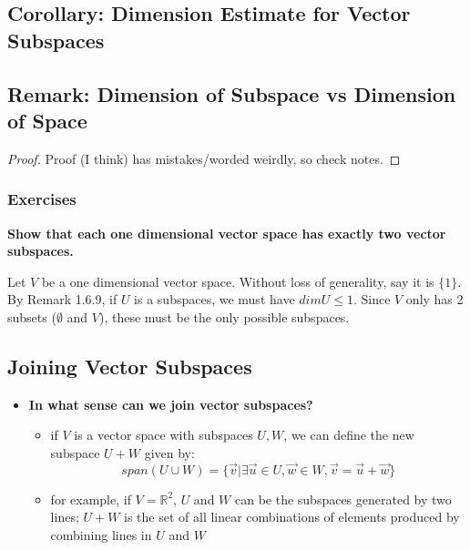 \documentclass{exam}
\begin{document}
\subsection{Corollary: Dimension Estimate for Vector Subspaces}


\subsection{Remark: Dimension of Subspace vs Dimension of Space}


\begin{proof}

Proof (I think) has mistakes/worded weirdly, so check notes.

\end{proof}

\subsubsection{Exercises}

\begin{questions}

\question \textbf{Show that each one dimensional vector space has exactly two vector subspaces.}

\bigskip

Let $V$ be a one dimensional vector space. Without loss of generality, say it is $\{1\}$. By Remark 1.6.9, if $U$ is a subspaces, we must have $dim U \leq 1$. Since $V$ only has 2 subsets ($\emptyset$ and $V$), these must be the only possible subspaces.

\end{questions}

\subsection{Joining Vector Subspaces}

\begin{itemize}
    \item \textbf{In what sense can we join vector subspaces?}
    \begin{itemize}
        \item if $V$ is a vector space with subspaces $U,W$, we can define the new subspace $U+W$ given by:
        \[
        span(U \cup W) = \{\vec{v} | \exists \vec{u} \in U, \vec{w} \in W, \vec{v} = \vec{u} + \vec{w}\}
        \]
        \item for example, if $V = \mathbb{R}^2$, $U$ and $W$ can be the subspaces generated by two lines; $U + W$ is the set of all linear combinations of elements produced by combining lines in $U$ and $W$
    \end{itemize}
\end{itemize}
\end{document}
